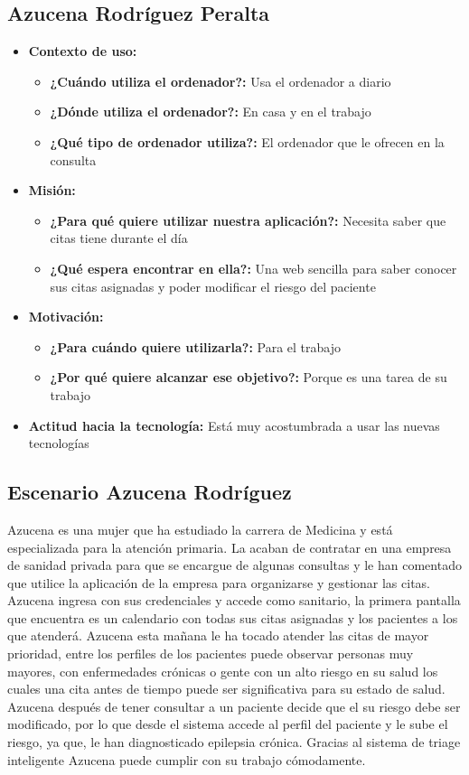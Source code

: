 \subsection{Azucena Rodríguez Peralta}
\begin{itemize}
    \item \textbf{Contexto de uso: } 
    \begin{itemize}
        \item \textbf{¿Cuándo utiliza el ordenador?: }  Usa el ordenador a diario
        \item \textbf{¿Dónde utiliza el ordenador?: } En casa y en el trabajo 
        \item \textbf{¿Qué tipo de ordenador utiliza?: } El ordenador que le ofrecen en la consulta
    \end{itemize}
    \item \textbf{Misión: } 
    \begin{itemize}
        \item \textbf{¿Para qué quiere utilizar nuestra aplicación?: } Necesita saber que citas tiene durante el día
        \item \textbf{¿Qué espera encontrar en ella?: } Una web sencilla para saber conocer sus citas asignadas y poder modificar el riesgo del paciente
    \end{itemize}
    \item \textbf{Motivación: } 
    \begin{itemize}
        \item \textbf{¿Para cuándo quiere utilizarla?: } Para el trabajo 
        \item \textbf{¿Por qué quiere alcanzar ese objetivo?: } Porque es una tarea de su trabajo
    \end{itemize}
    \item \textbf{Actitud hacia la tecnología: } Está muy acostumbrada a usar las nuevas tecnologías
\end{itemize}

\subsection{Escenario Azucena Rodríguez}
    Azucena es una mujer que ha estudiado la carrera de Medicina y está especializada para la atención primaria. 
    La acaban de contratar en una empresa de sanidad privada para que se encargue de algunas consultas y le
    han comentado que utilice la aplicación de la empresa para organizarse y gestionar las citas. 
    Azucena ingresa con sus credenciales y accede como sanitario, la primera pantalla que encuentra 
    es un calendario con todas sus citas asignadas y los pacientes a los que atenderá.
    Azucena esta mañana le ha tocado atender las citas de mayor prioridad, entre los perfiles de los pacientes
    puede observar personas muy mayores, con enfermedades crónicas o gente con un alto riesgo en su salud los cuales
    una cita antes de tiempo puede ser significativa para su estado de salud.
    Azucena después de tener consultar a un paciente decide que el su riesgo debe ser modificado, por lo que 
    desde el sistema accede al perfil del paciente y le sube el riesgo, ya que, le han diagnosticado epilepsia
    crónica. Gracias al sistema de triage inteligente Azucena puede cumplir con su trabajo cómodamente.